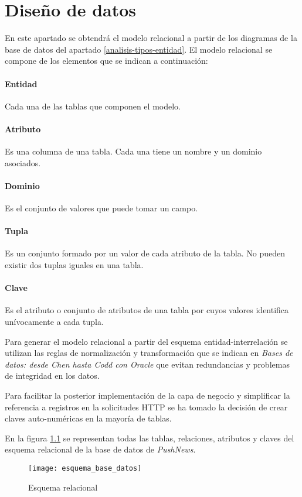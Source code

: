 \chapter{Diseño de datos}
En este apartado se obtendrá el modelo relacional a partir de los diagramas de la base de datos del apartado \ref{analisis-tipos-entidad}. El modelo relacional se compone de los elementos que se indican a continuación:

\subsubsection*{Entidad}
Cada una de las tablas que componen el modelo.

\subsubsection*{Atributo} Es una columna de una tabla. Cada una tiene un nombre y un dominio asociados.

\subsubsection*{Dominio}
Es el conjunto de valores que puede tomar un campo.

\subsubsection*{Tupla}
Es un conjunto formado por un valor de cada atributo de la tabla. No pueden existir dos tuplas iguales en una tabla.

\subsubsection*{Clave}
Es el atributo o conjunto de atributos de una tabla por cuyos valores identifica unívocamente a cada tupla.

Para generar el modelo relacional a partir del esquema entidad-interrelación se utilizan las reglas de normalización y transformación que se indican en \textit{Bases de datos: desde Chen hasta Codd con Oracle} \cite{basesdedatos-rama} que evitan redundancias y problemas de integridad en los datos.

Para facilitar la posterior implementación de la capa de negocio y simplificar la referencia a registros en la solicitudes HTTP se ha tomado la decisión de crear claves auto-numéricas en la mayoría de tablas.

En la figura \ref{fig:esquema-relacional} se representan todas las tablas, relaciones, atributos y claves del esquema relacional de la base de datos de \emph{PushNews}.

\begin{figure}[ht]
    \centering
    \texttt{[image: esquema\_base\_datos]}
    \caption{Esquema relacional}
    \label{fig:esquema-relacional}
\end{figure}
